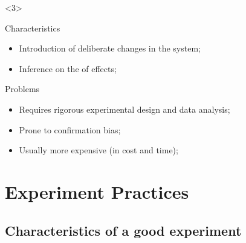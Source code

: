 \documentclass{beamer}
\begin{document}
\begin{frame}
\begin{onlyenv}<3>
  \begin{block}{Characteristics}
    \begin{itemize}
    \item Introduction of deliberate changes in the system;
    \item Inference on the  of effects;
    \end{itemize}
  \end{block}
  \begin{block}{Problems}
    \begin{itemize}
    \item Requires rigorous experimental design and data analysis;
    \item Prone to confirmation bias;
    \item Usually more expensive (in cost and time);
    \end{itemize}
  \end{block}
  \end{onlyenv}

\end{frame}











\section{Experiment Practices}
\subsection{Characteristics of a good experiment}
\end{document}
